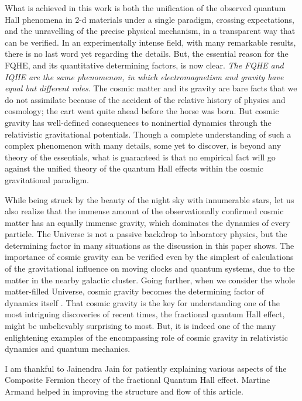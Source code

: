 \documentclass[aps,preprint,12pt,tightenlines]{revtex4}%
\begin{document}
What is achieved in this work is both the unification of the observed quantum
Hall phenomena in 2-d materials under a single paradigm, crossing
expectations, and the unravelling of the precise physical mechanism, in a
transparent way that can be verified. In an experimentally intense field, with
many remarkable results, there is no last word yet regarding the details. But,
the essential reason for the FQHE, and its quantitative determining factors,
is now clear. \emph{The FQHE and IQHE are the same phenomenon, in which
electromagnetism and gravity have equal but different roles}. The cosmic matter
and its gravity are bare facts that we do not assimilate because of the accident
of the relative history of physics and cosmology; the cart went quite ahead
before the horse was born. But cosmic gravity has well-defined consequences to
noninertial dynamics through the relativistic gravitational potentials. Though
a complete understanding of such a complex phenomenon with many details, some
yet to discover, is beyond any theory of the essentials, what is guaranteed is
that no empirical fact will go against the unified theory of the quantum Hall
effects within the cosmic gravitational paradigm.

While being struck by the beauty of the night sky with innumerable stars,
let us also realize that the immense amount of the observationally confirmed
cosmic matter has an equally immense gravity, which dominates the dynamics of
every particle. The Universe is not a passive backdrop to laboratory physics,
but the determining factor in many situations as the discussion in this paper
shows. The importance of cosmic gravity can be verified even by the simplest
of calculations of the gravitational influence on moving clocks and quantum
systems, due to the matter in the nearby galactic cluster. Going further, when
we consider the whole matter-filled Universe, cosmic gravity becomes the
determining factor of dynamics itself \cite{Unni-Cosrel,Unni-PhysNews,GravityTime}. That cosmic gravity
is the key for understanding one of the most intriguing discoveries of recent
times, the fractional quantum Hall effect, might be
unbelievably surprising to most. But, it is indeed one of the many
enlightening examples of the encompassing
role of cosmic gravity in relativistic dynamics and quantum mechanics.

\begin{acknowledgments}
I am thankful to Jainendra Jain for patiently explaining various aspects of
the Composite Fermion theory of the fractional Quantum Hall effect. Martine
Armand helped in improving the structure and flow of this article.
\end{acknowledgments}
\end{document}
